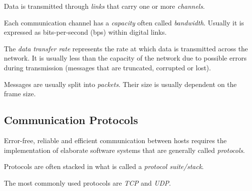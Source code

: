 \documentclass[12pt]{article}
\begin{document}
Data is transmitted through \textit{links} that carry one or more \textit{channels}.

Each communication channel has a \textit{capacity} often called \textit{bandwidth}. Usually it is expressed as bits-per-second (bps) within digital links.

The \textit{data transfer rate} represents the rate at which data is transmitted across the network. It is usually less than the capacity of the network due to possible errors during transmission (messages that are truncated, corrupted or lost).

Messages are usually split into \textit{packets}. Their size is usually dependent on the frame size.

\subsection{Communication Protocols}

Error-free, reliable and efficient communication between hosts requires the implementation of elaborate software systems that are generally called \textit{protocols}.

Protocols are often stacked in what is called a \textit{protocol suite/stack}.

The most commonly used protocols are \textit{TCP} and \textit{UDP}.
\end{document}
